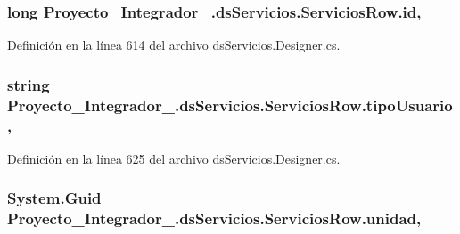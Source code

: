 \hypertarget{class_proyecto___integrador__3_1_1ds_servicios_1_1_servicios_row_a639945a9ac10b4caf0f453134dd2fbf3}{
\subsubsection[{id}]{\setlength{\rightskip}{0pt plus 5cm}long Proyecto\-\_\-\-Integrador\-\_.\-ds\-Servicios.\-Servicios\-Row.\-id\hspace{0.3cm}{\ttfamily [get]}, {\ttfamily [set]}}}\label{class_proyecto___integrador__3_1_1ds_servicios_1_1_servicios_row_a639945a9ac10b4caf0f453134dd2fbf3}


Definición en la línea 614 del archivo ds\-Servicios.\-Designer.\-cs.

\hypertarget{class_proyecto___integrador__3_1_1ds_servicios_1_1_servicios_row_abdee6fc7289aefefff6388effd42f27c}{
\subsubsection[{tipo\-Usuario}]{\setlength{\rightskip}{0pt plus 5cm}string Proyecto\-\_\-\-Integrador\-\_.\-ds\-Servicios.\-Servicios\-Row.\-tipo\-Usuario\hspace{0.3cm}{\ttfamily [get]}, {\ttfamily [set]}}}\label{class_proyecto___integrador__3_1_1ds_servicios_1_1_servicios_row_abdee6fc7289aefefff6388effd42f27c}


Definición en la línea 625 del archivo ds\-Servicios.\-Designer.\-cs.

\hypertarget{class_proyecto___integrador__3_1_1ds_servicios_1_1_servicios_row_a1eeaaa0bc7a97bcb431c5ae850268498}{
\subsubsection[{unidad}]{\setlength{\rightskip}{0pt plus 5cm}System.\-Guid Proyecto\-\_\-\-Integrador\-\_.\-ds\-Servicios.\-Servicios\-Row.\-unidad\hspace{0.3cm}{\ttfamily [get]}, {\ttfamily [set]}}}\label{class_proyecto___integrador__3_1_1ds_servicios_1_1_servicios_row_a1eeaaa0bc7a97bcb431c5ae850268498}


